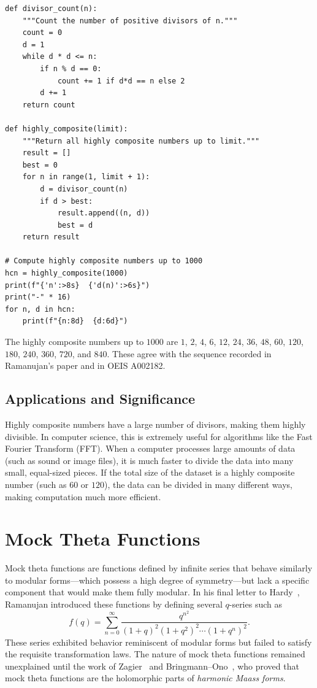 \documentclass[10pt]{amsart}
\theoremstyle{plain}
\theoremstyle{definition}
\theoremstyle{remark}
\begin{document}
\begin{lstlisting}
def divisor_count(n):
    """Count the number of positive divisors of n."""
    count = 0
    d = 1
    while d * d <= n:
        if n % d == 0:
            count += 1 if d*d == n else 2
        d += 1
    return count

def highly_composite(limit):
    """Return all highly composite numbers up to limit."""
    result = []
    best = 0
    for n in range(1, limit + 1):
        d = divisor_count(n)
        if d > best:
            result.append((n, d))
            best = d
    return result

# Compute highly composite numbers up to 1000
hcn = highly_composite(1000)
print(f"{'n':>8s}  {'d(n)':>6s}")
print("-" * 16)
for n, d in hcn:
    print(f"{n:8d}  {d:6d}")
\end{lstlisting}

The highly composite numbers up to $1000$ are
$1$, $2$, $4$, $6$, $12$, $24$, $36$, $48$, $60$, $120$, $180$, $240$, $360$, $720$, and $840$.
These agree with the sequence recorded in Ramanujan's paper
and in OEIS A002182.

\subsection{Applications and Significance}

Highly composite numbers have a large number of divisors, making them highly divisible. In computer science, this is extremely useful for algorithms like the Fast Fourier Transform (FFT). When a computer processes large amounts of data (such as sound or image files), it is much faster to divide the data into many small, equal-sized pieces. If the total size of the dataset is a highly composite number (such as $60$ or $120$), the data can be divided in many different ways, making computation much more efficient.

\section{Mock Theta Functions}
\label{sec:mock}

Mock theta functions are functions defined by infinite series that behave similarly to modular forms—which possess a high degree of symmetry—but lack a specific component that would make them fully modular. In his final letter to Hardy~\cite{ramanujan_1920}, Ramanujan introduced these functions by defining several $q$-series such as
\begin{equation}
\label{eq:mock_theta}
f(q) = \sum_{n=0}^{\infty} \frac{q^{n^2}}{(1+q)^2(1+q^2)^2\cdots(1+q^n)^2}.
\end{equation}
These series exhibited behavior reminiscent of modular forms but failed to satisfy the requisite transformation laws. The nature of mock theta functions remained unexplained until the work of Zagier~\cite{zagier_2010} and Bringmann--Ono~\cite{bringmann_ono_2010}, who proved that mock theta functions are the holomorphic parts of \emph{harmonic Maass forms}.
\end{document}
